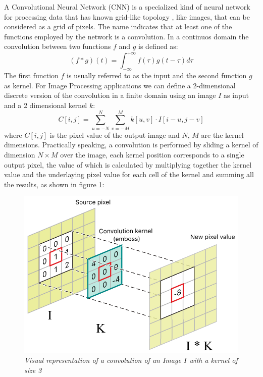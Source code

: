\documentclass[12pt,a4paper]{report}
\begin{document}
A Convolutional Neural Network (CNN) is a specialized kind of neural network for processing data that has known grid-like topology \cite{Goodfellow-et-al-2016}, like images, that can be considered as a grid of pixels.
The name indicates that at least one of the functions employed by the network is a convolution. In a continuos domain the convolution between two functions $f$ and $g$ is defined as: 
\begin{equation}
 (f * g)(t) = \int_{-\infty}^{+\infty} f(\tau)g(t-\tau)d\tau
\end{equation}
The first function $f$ is usually referred to as the input and the second function $g$ as kernel. 
For Image Processing applications we can define a 2-dimensional discrete version of the convolution in a finite domain using an image $I$ as input and a 2 dimensional kernel $k$:
\begin{equation}
 C[i, j] = \sum_{u=-N}^N \sum_{v=-M}^M k[u, v] \cdot I[i-u, j-v]
 \label{eq:conv}
\end{equation}
where $C[i, j]$ is the pixel value of the output image and $N$, $M$ are the kernel dimensions.
Practically speaking, a convolution is performed by sliding a kernel of dimension $N \times M$ over the image, each kernel position corresponds to a single output pixel, the value of which is calculated by multiplying together the kernel value and the underlaying pixel value for each cell of the kernel and summing all the results, as shown in figure \ref{fig:convolution}:

\begin{figure}[H]
 \centering
 \includegraphics[scale=0.5]{./images/conv.png}
 \caption{\it Visual representation of a convolution of an Image $I$ with a kernel of size 3}
 \label{fig:convolution}
\end{figure}
\end{document}
